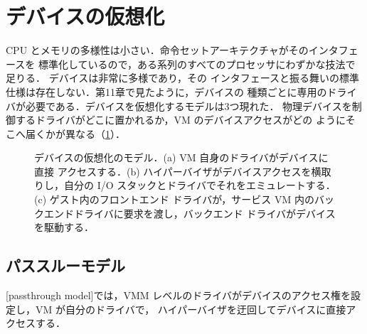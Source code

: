 \documentclass[../main.tex]{subfiles}
\begin{document}
\section{デバイスの仮想化}
\label{sec:l12-devices}

CPU とメモリの多様性は小さい．命令セットアーキテクチャがそのインタフェースを
標準化しているので，ある系列のすべてのプロセッサにわずかな技法で足りる．
デバイスは非常に多様であり，その
インタフェースと振る舞いの標準仕様は存在しない．第11章で見たように，デバイスの
種類ごとに専用のドライバが必要である．デバイスを仮想化するモデルは3つ現れた．
物理デバイスを制御するドライバがどこに置かれるか，VM のデバイスアクセスがどの
ようにそこへ届くかが異なる（\cref{fig:l12-devices}）．

\begin{figure}[htbp]
  \centering
  
  \caption{デバイスの仮想化のモデル．(a) VM 自身のドライバがデバイスに直接
    アクセスする．(b) ハイパーバイザがデバイスアクセスを横取りし，自分の I/O
    スタックとドライバでそれをエミュレートする．(c) ゲスト内のフロントエンド
    ドライバが，サービス VM 内のバックエンドドライバに要求を渡し，バックエンド
    ドライバがデバイスを駆動する．}
  \label{fig:l12-devices}
\end{figure}

\subsection{パススルーモデル}

\begin{definition}[パススルーモデル]
  [passthrough model]では，VMM
  レベルのドライバがデバイスのアクセス権を設定し，VM が自分のドライバで，
  ハイパーバイザを迂回してデバイスに直接アクセスする．
\end{definition}
\end{document}
